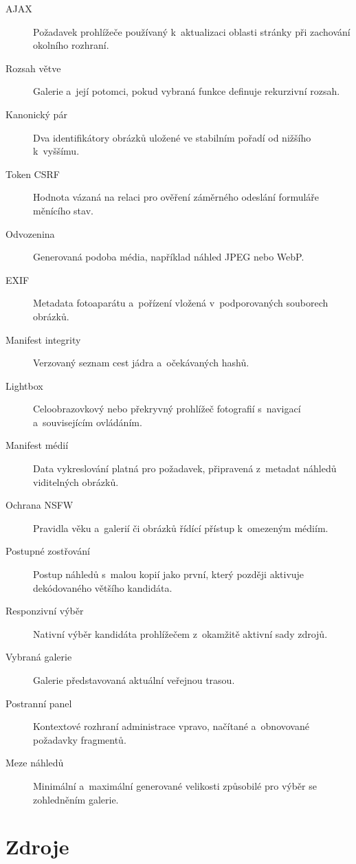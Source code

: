 \documentclass[11pt,a4paper]{article}
\begin{document}
\begin{description}
  \item[AJAX] Požadavek prohlížeče používaný k~aktualizaci oblasti stránky při
  zachování okolního rozhraní.
  \item[Rozsah větve] Galerie a~její potomci, pokud vybraná funkce definuje
  rekurzivní rozsah.
  \item[Kanonický pár] Dva identifikátory obrázků uložené ve stabilním pořadí od
  nižšího k~vyššímu.
  \item[Token CSRF] Hodnota vázaná na relaci pro ověření záměrného odeslání
  formuláře měnícího stav.
  \item[Odvozenina] Generovaná podoba média, například náhled JPEG nebo WebP.
  \item[EXIF] Metadata fotoaparátu a~pořízení vložená v~podporovaných souborech
  obrázků.
  \item[Manifest integrity] Verzovaný seznam cest jádra a~očekávaných hashů.
  \item[Lightbox] Celoobrazovkový nebo překryvný prohlížeč fotografií s~navigací
  a~souvisejícím ovládáním.
  \item[Manifest médií] Data vykreslování platná pro požadavek, připravená
  z~metadat náhledů viditelných obrázků.
  \item[Ochrana NSFW] Pravidla věku a~galerií či obrázků řídící přístup
  k~omezeným médiím.
  \item[Postupné zostřování] Postup náhledů s~malou kopií jako první, který
  později aktivuje dekódovaného většího kandidáta.
  \item[Responzivní výběr] Nativní výběr kandidáta prohlížečem z~okamžitě
  aktivní sady zdrojů.
  \item[Vybraná galerie] Galerie představovaná aktuální veřejnou trasou.
  \item[Postranní panel] Kontextové rozhraní administrace vpravo, načítané
  a~obnovované požadavky fragmentů.
  \item[Meze náhledů] Minimální a~maximální generované velikosti způsobilé pro
  výběr se zohledněním galerie.
\end{description}

\clearpage
\section{Zdroje}
\label{sec:references}
\end{document}
